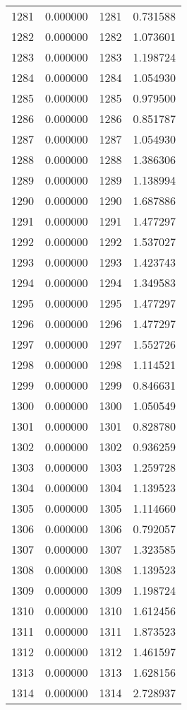 \documentclass[12pt]{article}
\begin{document}
\begin{longtable}{@{}cccc@{}}
1281 & 0.000000 & 1281 & 0.731588 \\
1282 & 0.000000 & 1282 & 1.073601 \\
1283 & 0.000000 & 1283 & 1.198724 \\
1284 & 0.000000 & 1284 & 1.054930 \\
1285 & 0.000000 & 1285 & 0.979500 \\
1286 & 0.000000 & 1286 & 0.851787 \\
1287 & 0.000000 & 1287 & 1.054930 \\
1288 & 0.000000 & 1288 & 1.386306 \\
1289 & 0.000000 & 1289 & 1.138994 \\
1290 & 0.000000 & 1290 & 1.687886 \\
1291 & 0.000000 & 1291 & 1.477297 \\
1292 & 0.000000 & 1292 & 1.537027 \\
1293 & 0.000000 & 1293 & 1.423743 \\
1294 & 0.000000 & 1294 & 1.349583 \\
1295 & 0.000000 & 1295 & 1.477297 \\
1296 & 0.000000 & 1296 & 1.477297 \\
1297 & 0.000000 & 1297 & 1.552726 \\
1298 & 0.000000 & 1298 & 1.114521 \\
1299 & 0.000000 & 1299 & 0.846631 \\
1300 & 0.000000 & 1300 & 1.050549 \\
1301 & 0.000000 & 1301 & 0.828780 \\
1302 & 0.000000 & 1302 & 0.936259 \\
1303 & 0.000000 & 1303 & 1.259728 \\
1304 & 0.000000 & 1304 & 1.139523 \\
1305 & 0.000000 & 1305 & 1.114660 \\
1306 & 0.000000 & 1306 & 0.792057 \\
1307 & 0.000000 & 1307 & 1.323585 \\
1308 & 0.000000 & 1308 & 1.139523 \\
1309 & 0.000000 & 1309 & 1.198724 \\
1310 & 0.000000 & 1310 & 1.612456 \\
1311 & 0.000000 & 1311 & 1.873523 \\
1312 & 0.000000 & 1312 & 1.461597 \\
1313 & 0.000000 & 1313 & 1.628156 \\
1314 & 0.000000 & 1314 & 2.728937 \\

\end{longtable}
\end{document}
